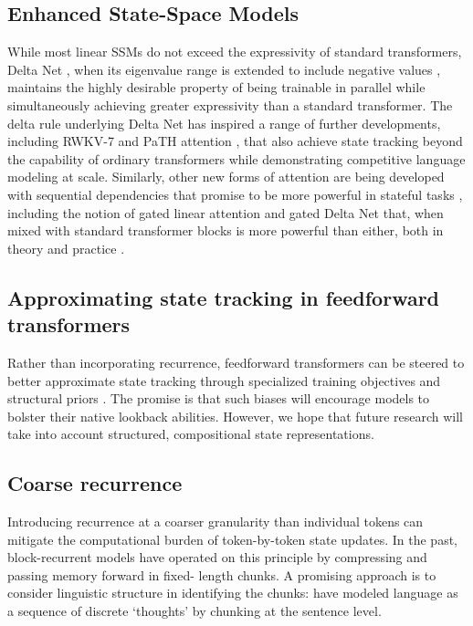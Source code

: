 \documentclass{llmxive}
\begin{document}
\subsection{Enhanced State-Space Models}
While most linear SSMs do not exceed the expressivity of standard transformers, 
Delta Net \citep{schlag2021}, when its eigenvalue range is extended to include negative 
values \citep{grazzi2025}, maintains the
highly desirable property of being trainable in parallel while simultaneously achieving
greater expressivity than a standard transformer. The delta rule underlying Delta Net
has inspired a range of further developments, including
RWKV-7 \citep{peng2025rwkv} and PaTH attention \citep{yang2025path}, that also
achieve state tracking beyond the capability of ordinary transformers while demonstrating
competitive language modeling at scale.
Similarly, other new forms of attention are being developed with
sequential dependencies that promise to be more powerful in stateful tasks 
\citep{lin2025forgetting,leviathan2025selective,beltagy2020longformer}, including the 
notion of gated linear attention \citep{Yang2024gatedlinearattention} and gated
Delta Net \citep{yang2025gated} that, when mixed with
standard transformer blocks is more powerful than either, both in
theory and practice \citep{merrill2026olmohybrid}.

\subsection{Approximating state tracking in feedforward transformers}
Rather than incorporating recurrence, feedforward transformers can be steered 
to better approximate state tracking through specialized training objectives and 
structural priors \citep{hu2025,teoh2025,huang2026semantictubepredictionbeating}.
The promise is that such biases will encourage models to bolster their
native lookback abilities. However, we hope that future research will take
into account structured, compositional state representations.

\subsection{Coarse recurrence}
Introducing recurrence at a coarser granularity than individual tokens can mitigate 
the computational burden of token-by-token state updates. In the past, block-recurrent
models have operated on this principle by compressing and passing memory forward in fixed-
length chunks. A promising approach is to consider linguistic structure in identifying
the chunks: \citet{borazjanizadeh2026} have modeled language as a sequence of discrete `thoughts' by chunking at the sentence level.
\end{document}
